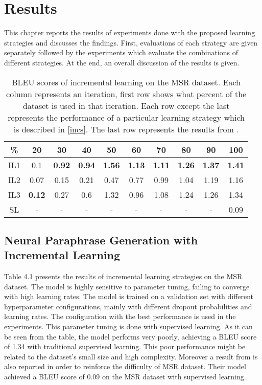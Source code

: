 \chapter{Results}\label{results}

This chapter reports the results of experiments done with the proposed learning strategies and discusses the findings. First, evaluations of each strategy are given separately followed by the experiments which evaluate the combinations of different strategies. At the end, an overall discussion of the results is given.

\begin{table}[t]
\centering
\small
 \begin{tabular}{|c | c | c | c | c | c | c | c | c | c |} 
 \hline
 \% & 20 & 30 & 40 & 50 & 60 & 70 & 80 & 90 & 100 \\ [0.5ex] 
 \hline
  IL1 & 0.1 &  \textbf{0.92} &  \textbf{0.94} &  \textbf{1.56} &  \textbf{1.13} &  \textbf{1.11} &  \textbf{1.26} &  \textbf{1.37} &  \textbf{1.41}  \\ 
 \hline
  IL2 & 0.07 & 0.15 & 0.21 & 0.47 & 0.77 & 0.99 & 1.04 & 1.19 & 1.16 \\ 
 \hline
 IL3 & \textbf{0.12} & 0.27 & 0.6 & 1.32 & 0.96 & 1.08 & 1.24 & 1.26 & 1.34 \\ 
 \hline
 SL & - & - & - & - & - & - & - & - & 0.09  \\ 
 \hline
\end{tabular}
\caption{BLEU scores of incremental learning on the MSR dataset. Each column represents an iteration, first row shows what percent of the dataset is used in that iteration. Each row except the last represents the performance of a particular learning strategy which is described in \ref{incs}. The last row represents the results from \cite{brad}.}
\label{table:4.1}
\end{table}

\section{Neural Paraphrase Generation with Incremental Learning}

Table 4.1 presents the results of incremental learning strategies on the MSR dataset. The model is highly sensitive to parameter tuning, failing to converge with high learning rates. The model is trained on a validation set with different hyperparameter configurations, mainly with different dropout probabilities and learning rates. The configuration with the best performance is used in the experiments. This parameter tuning is done with supervised learning. As it can be seen from the table, the model performs very poorly, achieving a BLEU score of 1.34 with traditional supervised learning. This poor performance might be related to the dataset's small size and high complexity. Moreover a result from \cite{brad} is also reported in order to reinforce the difficulty of MSR dataset. Their model achieved a BLEU score of 0.09 on the MSR dataset with supervised learning. 

